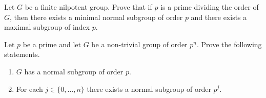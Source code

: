 
\begin{prob}
	Let $G$ be a finite nilpotent group. Prove that if $p$ is a prime dividing the order of $G$, then there
	exists a minimal normal subgroup of order $p$ and there exists a maximal subgroup of index $p$.
\end{prob}


\begin{prob}
	\label{xca:pgrupos}
	Let $p$ be a prime and let $G$ be a non-trivial group of order $p^n$. Prove the following statements.
	\begin{enumerate}
		\item $G$ has a normal subgroup of order $p$.
		\item For each $j\in\{0,\dots,n\}$ there exists a normal subgroup of order $p^j$. 
	\end{enumerate}
\end{prob}


